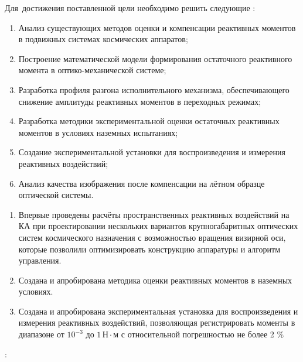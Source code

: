 Для~достижения поставленной цели необходимо решить следующие {\tasks}:
\begin{enumerate}[beginpenalty=10000] %
  \item Анализ существующих методов оценки и компенсации реактивных моментов в подвижных системах космических аппаратов;
  \item Построение математической модели формирования остаточного реактивного момента в оптико-механической системе;
  \item Разработка профиля разгона исполнительного механизма, обеспечивающего снижение амплитуды реактивных моментов в переходных режимах;
  \item Разработка методики экспериментальной оценки остаточных реактивных моментов в условиях наземных испытаниях;
  \item Создание экспериментальной установки для воспроизведения и измерения реактивных воздействий;
  \item Анализ качества изображения после компенсации на лётном образце оптической системы.
  
\end{enumerate}


{\novelty}
\begin{enumerate}[beginpenalty=10000] %
  \item Впервые проведены расчёты пространственных реактивных воздействий на КА при проектировании нескольких вариантов крупногабаритных оптических систем космического назначения с возможностью вращения визирной оси, которые позволили оптимизировать конструкцию аппаратуры и алгоритм управления.
  \item Создана и апробирована методика оценки реактивных моментов в наземных условиях.
  \item Создана и апробирована экспериментальная установка для воспроизведения и измерения реактивных воздействий, позволяющая регистрировать моменты в диапазоне от $10^{-3}$ до $1\,\text{Н}\cdot\text{м}$ с относительной погрешностью не более 2 \%
\end{enumerate}

{\influence}:

